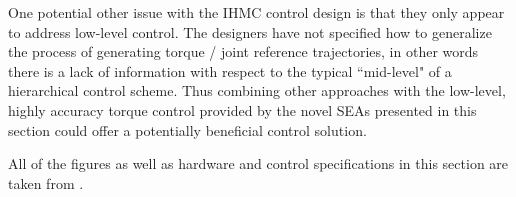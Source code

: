 \begin{refsection}
One potential other issue with the IHMC control design is that they only appear to address low-level control.  The designers have not specified how to generalize the process of generating torque / joint reference trajectories, in other words there is a lack of information with respect to the typical ``mid-level" of a hierarchical control scheme.  Thus combining other approaches with the low-level, highly accuracy torque control provided by the novel SEAs presented in this section could offer a potentially beneficial control solution.
 
All of the figures as well as hardware and control specifications in this section are taken from \cite{ihmc_2009}.
 
\printbibliography[heading=subbibliography]

\end{refsection}


% 





